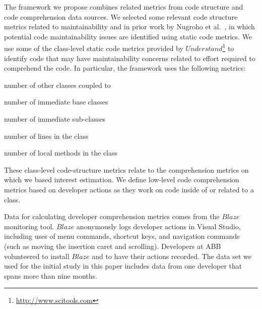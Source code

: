 
The framework we propose combines related metrics from code structure and code comprehension data sources.  We selected some relevant code structure metrics related to maintainability and \TD in prior work by Nugroho et al.~\cite{Nugroho_etal:2011}, in which potential code maintainability issues are identified using static code metrics.  We use some of the class-level static code metrics provided by $Understand$\footnote{\url{http://www.scitools.com}} to identify code that may have maintainability concerns related to effort required to comprehend the code. In particular, the framework uses the following metrics:
\begin{description}[font=\itshape\mdseries,style=nextline]
    \item[Count Class Coupled] number of other classes coupled to
    \item[Count Class Base] number of immediate base classes
    \item[Count Class Derived] number of immediate sub-classes
    \item[Count Line Code] number of lines in the class
    \item[Count Declared Method] number of local methods in the class
\end{description}

These class-level code-structure metrics relate to the comprehension metrics on which we based interest estimation. We define low-level code comprehension metrics based on developer actions as they work on code inside of or related to a class.

Data for calculating developer comprehension metrics comes from the $Blaze$~\cite{Snipes_etal:2014} monitoring tool.  $Blaze$ anonymously logs developer actions in Visual Studio, including uses of menu commands, shortcut keys, and navigation commands (such as moving the insertion caret and scrolling).  Developers at ABB volunteered to install $Blaze$ and to have their actions recorded.  The data set we used for the initial study in this paper includes data from one developer that spans more than nine months.

